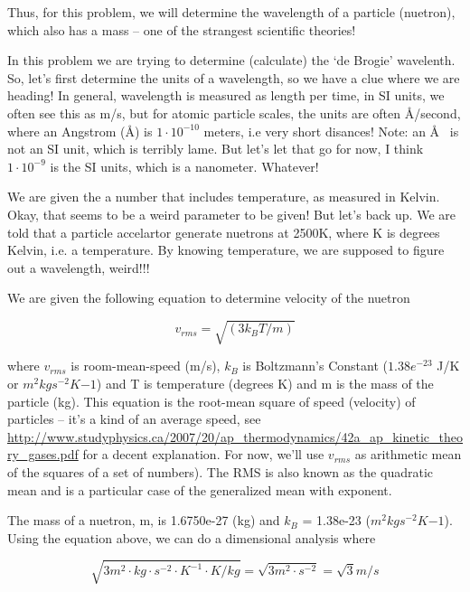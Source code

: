 \documentclass{article}
\newcommand{\angstrom}{\textup{\AA}}
\begin{document}
Thus, for this problem, we will determine the wavelength of a particle (nuetron), which also has a mass -- one of the strangest scientific theories!

In this problem we are trying to determine (calculate) the `de Brogie' wavelenth. So, let's first determine the units of a wavelength, so we have a clue where we are heading!  In general, wavelength is measured as length per time, in SI units, we often see this as m/s, but for atomic particle scales, the units are often \angstrom/second, where an Angstrom (\angstrom) is $1 \cdot  10^{-10}$ meters, i.e very short disances! Note: an \angstrom~ is not an SI unit, which is terribly lame. But let's let that go for now, I think $1\cdot 10^{-9}$ is the SI units, which is a nanometer.  Whatever!

We are given the a number that includes temperature, as measured in Kelvin. Okay, that seems to be a weird parameter to be given! But let's back up. We are told that a particle accelartor generate nuetrons at 2500K, where K is degrees Kelvin, i.e. a temperature. By knowing temperature, we are supposed to figure out a wavelength, weird!!!

We are given the following equation to determine velocity of the nuetron

\begin{equation}
v_{rms} = \sqrt{(3k_BT/m)}
\end{equation}

where $v_{rms}$ is room-mean-speed (m/s), $k_B$ is Boltzmann's Constant ($1.38e^{-23}$ J/K or $m^2kg s^{-2} K{-1}$) and T is temperature (degrees K) and m is the mass of the particle (kg). This equation is the root-mean square of speed (velocity) of particles -- it's a kind of an average speed, see \url{http://www.studyphysics.ca/2007/20/ap_thermodynamics/42a_ap_kinetic_theory_gases.pdf} for a decent explanation. For now, we'll use $v_{rms}$ as arithmetic mean of the squares of a set of numbers). The RMS is also known as the quadratic mean and is a particular case of the generalized mean with exponent.

The mass of a nuetron, m, is 1.6750e-27 (kg) and $k_B$ = 1.38e-23 ($m^2kg s^{-2} K{-1}$). Using the equation above, we can do a dimensional analysis where

\begin{equation}
\sqrt{3  m^2\cdot kg\cdot s^{-2} \cdot K^{-1} \cdot K/ kg} = \sqrt{3m^2 \cdot s^{-2}} = \sqrt{3}m/s
\end{equation}
\end{document}
